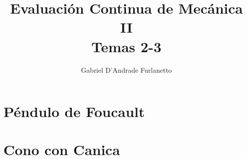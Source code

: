 \documentclass[a4paper,12pt]{article}
\begin{document}
\title{Evaluación Continua de Mecánica II\\ Temas 2-3}
\author{Gabriel D'Andrade Furlanetto}
\maketitle 

\section{Péndulo de Foucault}


\section{Cono con Canica}
\end{document}
